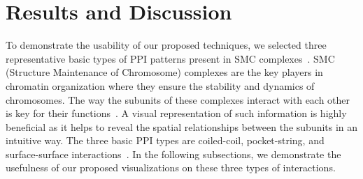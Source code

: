 \documentclass{bmcart}
\def\MatView {Matrix view\xspace}
\begin{document}

\section*{Results and Discussion}

To demonstrate the usability of our proposed techniques, we selected three representative basic types of PPI patterns present in SMC complexes~\cite{Palecek2015}. 
SMC (Structure Maintenance of Chromosome) complexes are the key players in chromatin organization where they ensure the stability and dynamics of chromosomes. The way the subunits of these complexes interact with each other is key for their functions~\cite{Gligoris}.
A visual representation of such information is highly beneficial as it helps to reveal the spatial relationships between the subunits in an intuitive way.
The three basic PPI types are coiled-coil, pocket-string, and surface-surface interactions~\cite{alberts02molecular}.
In the following subsections, we demonstrate the usefulness of our proposed visualizations on these three types of interactions.
\end{document}
